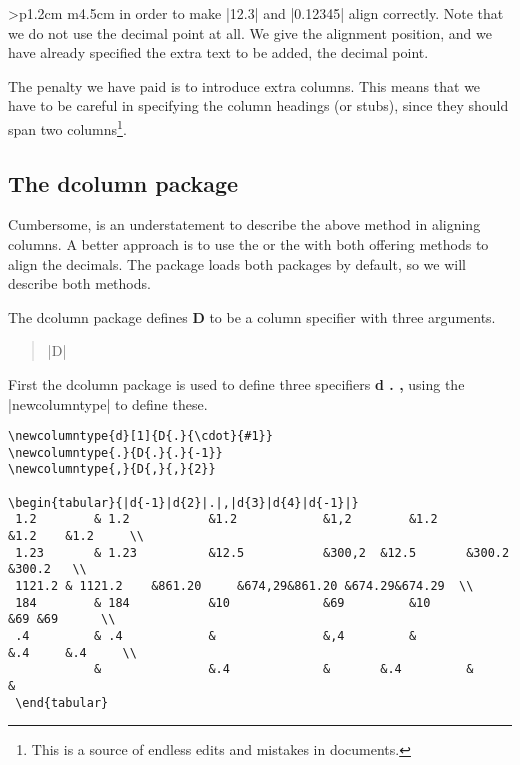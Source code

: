 \begin{tabular}{>{\bfseries}p{1.2cm} m{4.5cm}}
\noindent in order to make |12.3| and |0.12345| align correctly. Note that
we do not use the decimal point at all. We give the alignment
position, and we have already specified the extra text
to be added, the decimal point. 

The penalty we have paid
is to introduce extra columns. This means that we have to
be careful in specifying the column headings (or stubs), since
they should span two columns\footnote{This is a source of endless edits and mistakes in documents.}.

\subsection{The dcolumn package}
Cumbersome, is an understatement to describe the above method in aligning columns. A better approach is to
use the  or the  with both offering methods to align the decimals. The  package loads both packages by default, so we will describe both methods.

The dcolumn package defines \textbf{D} to be a column specifier with three arguments.

\begin{quote}
|D|
\end{quote}

First the dcolumn package is used to define three specifiers \textbf{d . ,}  using the |newcolumntype|
to define these.


\begin{scriptexample}{}{}
\begin{verbatim}
\newcolumntype{d}[1]{D{.}{\cdot}{#1}}
\newcolumntype{.}{D{.}{.}{-1}}
\newcolumntype{,}{D{,}{,}{2}}

\begin{tabular}{|d{-1}|d{2}|.|,|d{3}|d{4}|d{-1}|}
 1.2     	& 1.2   		&1.2    		&1,2    	&1.2    	&1.2	&1.2     \\
 1.23   	& 1.23  		&12.5   		&300,2  &12.5   	&300.2	&300.2   \\
 1121.2	& 1121.2	&861.20 	&674,29&861.20 &674.29&674.29  \\
 184    	& 184   		&10     		&69     	&10     	&69	&69      \\
 .4      	& .4    		&       		&,4     	&       	&.4 	&.4     \\
         	&       		&.4     		&		&.4     	&		& 
 \end{tabular}        	
\end{verbatim}         	


\end{scriptexample}
\end{tabular}
